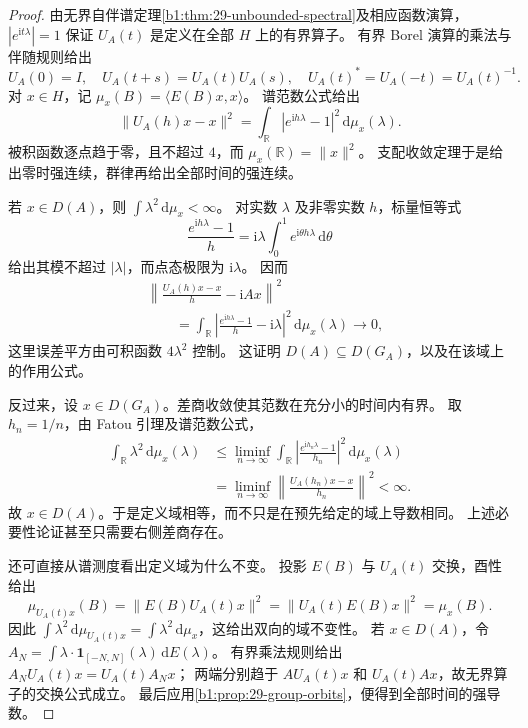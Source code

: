 \begin{proof}
由无界自伴谱定理\cref{b1:thm:29-unbounded-spectral}及相应函数演算，
\(|e^{\mathrm it\lambda}|=1\) 保证 \(U_A(t)\) 是定义在全部 \(H\) 上的有界算子。
有界 Borel 演算的乘法与伴随规则给出
\[
 U_A(0)=I,\quad U_A(t+s)=U_A(t)U_A(s),\quad
 U_A(t)^*=U_A(-t)=U_A(t)^{-1}.
\]
对 \(x\in H\)，记 \(\mu_x(B)=\langle E(B)x,x\rangle\)。
谱范数公式给出
\[
 \|U_A(h)x-x\|^2
 =\int_{\mathbb R}|e^{\mathrm ih\lambda}-1|^2\,\mathrm d\mu_x(\lambda).
\]
被积函数逐点趋于零，且不超过 \(4\)，而 \(\mu_x(\mathbb R)=\|x\|^2\)。
支配收敛定理于是给出零时强连续，群律再给出全部时间的强连续。

若 \(x\in D(A)\)，则 \(\int\lambda^2\,\mathrm d\mu_x<\infty\)。
对实数 \(\lambda\) 及非零实数 \(h\)，标量恒等式
\[
 \frac{e^{\mathrm ih\lambda}-1}{h}
 =\mathrm i\lambda\int_0^1e^{\mathrm i\theta h\lambda}\,\mathrm d\theta
\]
给出其模不超过 \(|\lambda|\)，而点态极限为 \(\mathrm i\lambda\)。
因而
\[
 \begin{split}
 &\left\|\frac{U_A(h)x-x}{h}-\mathrm iAx\right\|^2\\
 &\qquad=\int_{\mathbb R}
  \left|\frac{e^{\mathrm ih\lambda}-1}{h}-\mathrm i\lambda\right|^2
  \,\mathrm d\mu_x(\lambda)\longrightarrow0,
 \end{split}
\]
这里误差平方由可积函数 \(4\lambda^2\) 控制。
这证明 \(D(A)\subseteq D(G_A)\)，以及在该域上的作用公式。

反过来，设 \(x\in D(G_A)\)。差商收敛使其范数在充分小的时间内有界。
取 \(h_n=1/n\)，由 Fatou 引理及谱范数公式，
\[
 \begin{split}
 \int_{\mathbb R}\lambda^2\,\mathrm d\mu_x(\lambda)
 &\leq\liminf_{n\to\infty}
  \int_{\mathbb R}
   \left|\frac{e^{\mathrm ih_n\lambda}-1}{h_n}\right|^2
   \,\mathrm d\mu_x(\lambda)\\
 &=\liminf_{n\to\infty}
  \left\|\frac{U_A(h_n)x-x}{h_n}\right\|^2<\infty.
 \end{split}
\]
故 \(x\in D(A)\)。于是定义域相等，而不只是在预先给定的域上导数相同。
上述必要性论证甚至只需要右侧差商存在。

还可直接从谱测度看出定义域为什么不变。
投影 \(E(B)\) 与 \(U_A(t)\) 交换，酉性给出
\[
 \mu_{U_A(t)x}(B)
 =\|E(B)U_A(t)x\|^2
 =\|U_A(t)E(B)x\|^2=\mu_x(B).
\]
因此 \(\int\lambda^2\,\mathrm d\mu_{U_A(t)x}
=\int\lambda^2\,\mathrm d\mu_x\)，这给出双向的域不变性。
若 \(x\in D(A)\)，令
\(A_N=\int\lambda\cdot\mathbf1_{[-N,N]}(\lambda)\,\mathrm dE(\lambda)\)。
有界乘法规则给出 \(A_NU_A(t)x=U_A(t)A_Nx\)；
两端分别趋于 \(AU_A(t)x\) 和 \(U_A(t)Ax\)，故无界算子的交换公式成立。
最后应用\cref{b1:prop:29-group-orbits}，便得到全部时间的强导数。
\end{proof}

